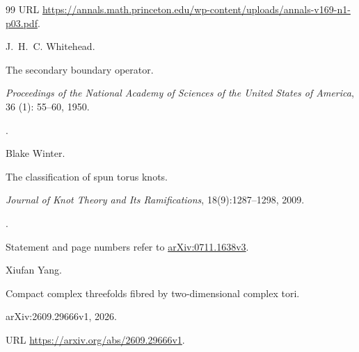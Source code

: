 \documentclass[11pt,a4paper]{article}
\numberwithin{equation}{section}
\theoremstyle{definition}
\begin{document}
\begin{thebibliography}{99}
\newblock URL
  \url{https://annals.math.princeton.edu/wp-content/uploads/annals-v169-n1-p03.pdf}.

J.~H.~C. Whitehead.

\newblock The secondary boundary operator.

\newblock \emph{Proceedings of the National Academy of Sciences of the United
  States of America}, 36 (1): 55--60, 1950.

\newblock {}.

Blake Winter.

\newblock The classification of spun torus knots.

\newblock \emph{Journal of Knot Theory and Its Ramifications},
18(9):1287--1298, 2009.

\newblock {}.

\newblock Statement and page numbers refer to
\href{https://arxiv.org/abs/0711.1638v3}{arXiv:0711.1638v3}.

Xiufan Yang.

\newblock Compact complex threefolds fibred by two-dimensional complex tori.

\newblock arXiv:2609.29666v1, 2026.

\newblock URL \url{https://arxiv.org/abs/2609.29666v1}.

\end{thebibliography}
\end{document}
